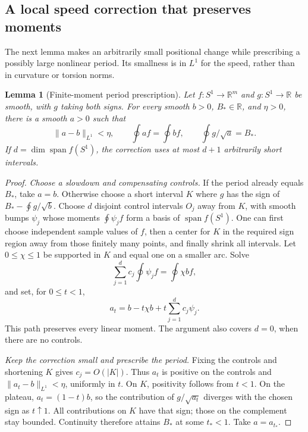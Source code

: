 \documentclass[11pt]{amsart}
\newtheorem{lemma}[theorem]{Lemma}
\theoremstyle{definition}
\theoremstyle{remark}
\newcommand{\R}{\mathbb R}\newcommand{\Sph}{\mathbb S}
\numberwithin{equation}{section}
\begin{document}
\subsection{A local speed correction that preserves moments}
The next lemma makes an arbitrarily small positional change while
prescribing a possibly large nonlinear period. Its smallness is in $L^1$
for the speed, rather than in curvature or torsion norms.
\begin{lemma}[Finite-moment period prescription]\label{lem:finite-moment-balance}
Let $f:S^1\to\R^m$ and $g:S^1\to\R$ be smooth, with $g$ taking both
signs. For every smooth $b>0$, $B_*\in\R$, and $\eta>0$, there is a
smooth $a>0$ such that
\begin{equation}\label{eq:finite-moment-balance}
 \|a-b\|_{L^1}<\eta,\qquad
 \oint af=\oint bf,\qquad \oint g/\sqrt a=B_*.
\end{equation}
If $d=\dim\operatorname{span}f(S^1)$, the correction uses at most $d+1$
arbitrarily short intervals.
\end{lemma}
\begin{proof}
\emph{Choose a slowdown and compensating controls.}
If the period already equals $B_*$, take $a=b$. Otherwise choose a short
interval $K$ where $g$ has the sign of $B_*-\oint g/\sqrt b$.
Choose $d$ disjoint control intervals $O_j$ away from $K$, with smooth
bumps $\psi_j$ whose moments $\oint\psi_jf$ form a basis of
$\operatorname{span}f(S^1)$. One can first choose independent sample
values of $f$, then a center for $K$ in the required sign region away
from those finitely many points, and finally shrink all intervals.
Let $0\le\chi\le1$ be supported in $K$ and equal one on a smaller arc.
Solve
\[
 \sum_{j=1}^d c_j\oint\psi_jf=\oint\chi bf,
\]
and set, for $0\le t<1$,
\[
 a_t=b-t\chi b+t\sum_{j=1}^d c_j\psi_j.
\]
This path preserves every linear moment. The argument also covers $d=0$,
when there are no controls.

\emph{Keep the correction small and prescribe the period.}
Fixing the controls and shortening $K$ gives $c_j=O(|K|)$. Thus $a_t$
is positive on the controls and $\|a_t-b\|_{L^1}<\eta$, uniformly in
$t$. On $K$, positivity follows from $t<1$. On the plateau,
$a_t=(1-t)b$, so the contribution of $g/\sqrt{a_t}$ diverges with the
chosen sign as $t\uparrow1$. All contributions on $K$ have that sign;
those on the complement stay bounded. Continuity therefore attains $B_*$
at some $t_*<1$. Take $a=a_{t_*}$.
\end{proof}
\end{document}
